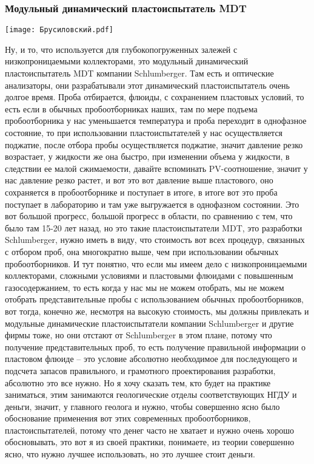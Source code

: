 \documentclass[main.tex]{subfiles}
\begin{document}
\subsubsection{Модульный динамический пластоиспытатель MDT}

\begin{center}
\texttt{[image: Брусиловский.pdf]}
\end{center}

Ну, и то, что используется для глубокопогруженных залежей с низкопроницаемыми коллекторами, это модульный динамический пластоиспытатель MDT компании Schlumberger.
Там есть и оптические анализаторы, они разрабатывали этот динамический пластоиспытатель очень долгое время.
Проба отбирается, флюиды, с сохранением пластовых условий, то есть если в обычных пробоотборниках наших, там по мере подъема пробоотборника у нас уменьшается температура и проба переходит в однофазное состояние, то при использовании пластоиспытателей у нас осуществляется поджатие, после отбора пробы осуществляется поджатие, значит давление резко возрастает, у жидкости же она быстро, при изменении объема у жидкости, в следствии ее малой сжимаемости, давайте вспоминать PV-соотношение, значит у нас давление резко растет, и вот это вот давление выше пластового, оно сохраняется в пробоотборнике и поступает в итоге, в итоге вот это проба поступает в лабораторию и там уже выгружается в однофазном состоянии.
Это вот большой прогресс, большой прогресс в области, по сравнению с тем, что было там 15-20 лет назад, но это такие пластоиспытатели MDT, это разработки Schlumberger, нужно иметь в виду, что стоимость вот всех процедур, связанных с отбором проб, она многократно выше, чем при использовании обычных пробоотборников.
И тут понятно, что если мы имеем дело с низкопроницаемыми коллекторами, сложными условиями и пластовыми флюидами с повышенным газосодержанием, то есть когда у нас мы не можем отобрать, мы не можем отобрать представительные пробы с использованием обычных пробоотборников, вот тогда, конечно же, несмотря на высокую стоимость, мы должны привлекать и модульные динамические пластоиспытатели компании Schlumberger и другие фирмы тоже, но они отстают от Schlumberger в этом плане, потому что получение представительных проб, то есть получение правильной информации о пластовом флюиде -- это условие абсолютно необходимое для последующего и подсчета запасов правильного, и грамотного проектирования разработки, абсолютно это все нужно.
Но я хочу сказать тем, кто будет на практике заниматься, этим занимаются геологические отделы соответствующих НГДУ и деньги, значит, у главного геолога и нужно, чтобы совершенно ясно было обоснование применения вот этих современных пробоотборников, пластоиспытателей, потому что денег часто не хватает и нужно очень хорошо обосновывать, это вот я из своей практики, понимаете, из теории совершенно ясно, что нужно лучшее использовать, но это лучшее стоит деньги.
\end{document}
